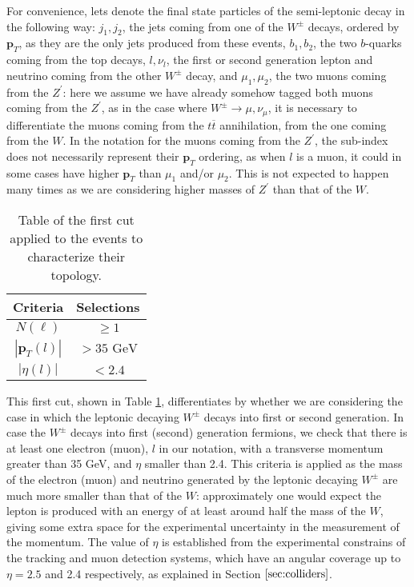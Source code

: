 For convenience, lets denote the final state particles of the semi-leptonic decay in the following way: $j_1, j_2$, the jets coming from one of the $W^{\pm}$ decays, ordered by $\bm{p}_T$, as they are the only jets produced from these events, $b_1, b_2$, the two $b$-quarks coming from the top decays, $l, \nu_l$, the first or second generation lepton and neutrino coming from the other $W^{\pm}$ decay, and $\mu_1, \mu_2$, the two muons coming from the $Z^{\prime}$: here we assume we have already somehow tagged both muons coming from the $Z^{\prime}$, as in the case where $W^{\pm} \rightarrow \mu, \nu_{\mu}$, it is necessary to differentiate the muons coming from the $t\overline t$ annihilation, from the one coming from the $W$. In the notation for the muons coming from the $Z^{\prime}$, the sub-index does not necessarily represent their $\bm{p}_T$ ordering, as when $l$ is a muon, it could in some cases have higher $\bm{p}_T$ than $\mu_1$ and/or $\mu_2$. This is not expected to happen many times as we are considering higher masses of $Z^{\prime}$ than that of the $W$.

\begin{table}[ht!]
\centering
\caption{Table of the first cut applied to the events to characterize their topology.}
\label{cut1}
\begin{tabular}{cc}
\hline
\hline
 Criteria & Selections \\
\hline
 $N(\ell)$ & $\geq 1$ \\
 $|\bm{p}_T(l)|$ & $> 35\textrm{ GeV}$ \\
 $|\eta(l)|$ & $< 2.4$  \\
\hline
\hline
\end{tabular}
\end{table}

This first cut, shown in Table \ref{cut1}, differentiates by whether we are considering the case in which the leptonic decaying $W^{\pm}$ decays into first or second generation. In case the $W^{\pm}$ decays into first (second) generation fermions, we check that there is at least one electron (muon), $l$ in our notation, with a transverse momentum greater than 35 GeV, and $\eta$ smaller than 2.4. This criteria is applied as the mass of the electron (muon) and neutrino generated by the leptonic decaying $W^{\pm}$ are much more smaller than that of the $W$: approximately one would expect the lepton is produced with an energy of at least around half the mass of the $W$, giving some extra space for the experimental uncertainty in the measurement of the momentum. The value of $\eta$ is established from the experimental constrains of the tracking and muon detection systems, which have an angular coverage up to $\eta = 2.5$ and 2.4 respectively, as explained in Section $\ref{sec:colliders}$.

